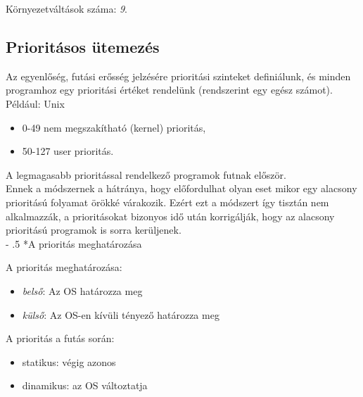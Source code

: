\documentclass[tikz,12pt,margin=0px]{article}
\makeatletter
\renewcommand\paragraph{%
	\@startsection{paragraph}{4}{0mm}%
	{-\baselineskip}%
	{.5\baselineskip}%
	{\normalfont\normalsize\bfseries}}
\makeatother
\begin{document}
    \noindent Környezetváltások száma: \emph{9}.\\

    \subsection*{Prioritásos ütemezés}

    Az egyenlőség, futási erősség jelzésére prioritási szinteket definiálunk, és minden programhoz egy prioritási értéket rendelünk (rendszerint egy egész számot).\\

    \noindent Például: Unix
    \begin{itemize}[topsep=8pt,itemsep=4pt,partopsep=4pt, parsep=4pt]
        \item 0-49 nem megszakítható (kernel) prioritás,
        \item 50-127 user prioritás.
    \end{itemize}
    A legmagasabb prioritással rendelkező programok futnak először. \\

    \noindent Ennek a módszernek a hátránya, hogy előfordulhat olyan eset mikor egy alacsony prioritású folyamat örökké várakozik. Ezért ezt a módszert így tisztán nem alkalmazzák, a prioritásokat bizonyos idő után korrigálják, hogy az alacsony prioritású programok is sorra kerüljenek.\\

    \paragraph*{A prioritás meghatározása}

    \noindent A prioritás meghatározása:
    \begin{itemize}[topsep=8pt,itemsep=4pt,partopsep=4pt, parsep=4pt]
      \item \emph{belső}: Az OS határozza meg
      \item \emph{külső}: Az OS-en kívüli tényező határozza meg
    \end{itemize}

    \noindent A prioritás a futás során:
    \begin{itemize}[topsep=8pt,itemsep=4pt,partopsep=4pt, parsep=4pt]
        \item statikus: végig azonos
        \item dinamikus: az OS változtatja
    \end{itemize}
\end{document}
